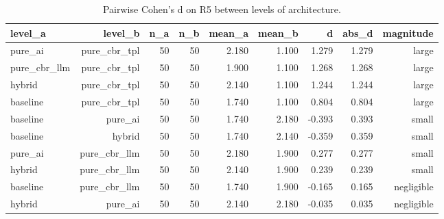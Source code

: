 \begin{table}[htbp]
\centering
\caption{Pairwise Cohen's d on R5 between levels of architecture.}
\label{tab:cohensd-architecture-R5}
\begin{tabular}{lrrrrrrrr}
\toprule
level\_a & level\_b & n\_a & n\_b & mean\_a & mean\_b & d & abs\_d & magnitude \\
\midrule
pure\_ai & pure\_cbr\_tpl & 50 & 50 & 2.180 & 1.100 & 1.279 & 1.279 & large \\
pure\_cbr\_llm & pure\_cbr\_tpl & 50 & 50 & 1.900 & 1.100 & 1.268 & 1.268 & large \\
hybrid & pure\_cbr\_tpl & 50 & 50 & 2.140 & 1.100 & 1.244 & 1.244 & large \\
baseline & pure\_cbr\_tpl & 50 & 50 & 1.740 & 1.100 & 0.804 & 0.804 & large \\
baseline & pure\_ai & 50 & 50 & 1.740 & 2.180 & -0.393 & 0.393 & small \\
baseline & hybrid & 50 & 50 & 1.740 & 2.140 & -0.359 & 0.359 & small \\
pure\_ai & pure\_cbr\_llm & 50 & 50 & 2.180 & 1.900 & 0.277 & 0.277 & small \\
hybrid & pure\_cbr\_llm & 50 & 50 & 2.140 & 1.900 & 0.239 & 0.239 & small \\
baseline & pure\_cbr\_llm & 50 & 50 & 1.740 & 1.900 & -0.165 & 0.165 & negligible \\
hybrid & pure\_ai & 50 & 50 & 2.140 & 2.180 & -0.035 & 0.035 & negligible \\
\bottomrule
\end{tabular}
\end{table}
